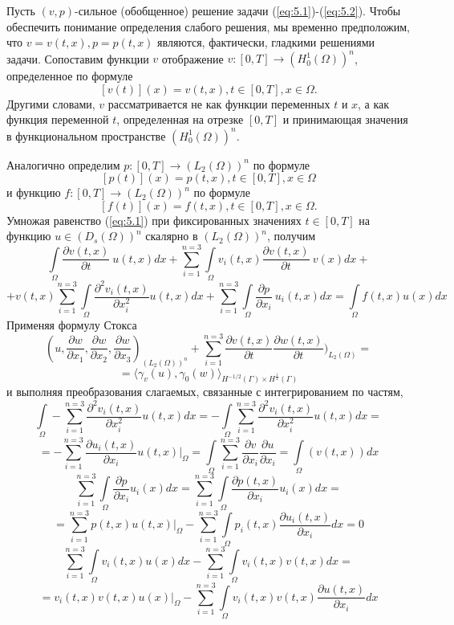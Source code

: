 Пусть $(v,p)$-сильное (обобщенное) решение задачи (\ref{eq:5.1})-(\ref{eq:5.2}).
Чтобы обеспечить понимание определения слабого решения, мы временно предположим, что $v=v(t,x), p=p(t,x)$ являются, фактически, гладкими решениями задачи.
Сопоставим функции $v$ отображение $v:[0,T]\rightarrow (H^{1}_0(\Omega))^n$, определенное по формуле $$[v(t)](x)=v(t,x), t\in[0,T], x\in\Omega.$$
Другими словами, $v$ рассматривается не как функции переменных $t$ и $x$, а как функция переменной $t$, определенная на отрезке
$[0,T]$ и принимающая значения в функциональном пространстве $(H^{1}_0(\Omega))^n$.

Аналогично определим $p:[0,T]\rightarrow (L_2(\Omega))^n$ по формуле $$[p(t)](x)=p(t,x), t\in[0,T],
x\in\Omega$$ и функцию $f:[0,T]\rightarrow (L_2(\Omega))^n$ по формуле $$[f(t)](x)=f(t,x), t\in[0,T], x\in\Omega.$$
Умножая равенство (\ref{eq:5.1}) при фиксированных значениях $t\in [0,T]$ на функцию $u\in (D_s(\Omega))^n$ скалярно в $(L_2(\Omega))^n$, получим
$$\int\limits_\Omega \frac{\partial v(t,x)}{\partial t}\ u(t,x)dx+\sum_{i=1}^{n=3}\int\limits_\Omega v_i(t,x)\frac{\partial v(t,x)}{\partial t}\ v(x)dx+$$
$$+v(t,x)\sum_{i=1}^{n=3}\int\limits_\Omega\frac{\partial^2 v_i(t,x)}{\partial x^{2}_i} u(t,x)dx+\sum_{i=1}^{n=3}\int\limits_\Omega \frac{\partial p}{\partial x_i}\ u_i(t,x)dx=\int\limits_\Omega f(t,x)u(x)dx$$
Применяя формулу Стокса
$$(u,\frac{\partial w}{\partial x_1},\frac{\partial w}{\partial x_2},\frac{\partial w}{\partial x_3})_{(L_2(\Omega))^n}+\sum_{i=1}^{n=3}\frac{\partial v(t,x)}{\partial t}\frac{\partial w(t,x)}{\partial t})_{L_2(\Omega)}=$$
$$= \langle \gamma_v(u),\gamma_0(w) \rangle_{H^{-1/2}(\Gamma)\times H^\frac{1}{2}(\Gamma)}$$
и выполняя преобразования слагаемых, связанные с интегрированием по частям,
$$\int\limits_\Omega -\sum_{i=1}^{n=3}\frac{\partial^2 v_i(t,x)}{\partial x^{2}_i}u(t,x)dx=-\int\limits_\Omega \sum_{i=1}^{n=3}\frac{\partial^2 v_i(t,x)}{\partial x^{2}_i}u(t,x)dx=$$
$$=-\sum_{i=1}^{n=3}\frac{\partial u_i(t,x)}{\partial x_i}u(t,x)|_{\Omega}=\int\limits_\Omega\sum_{i=1}^{n=3}\frac{\partial v}{\partial x_i}\frac{\partial u}{\partial x_i}=\int\limits_\Omega(v(t,x))dx$$
$$\sum_{i=1}^{n=3}\int\limits_\Omega \frac{\partial p}{\partial x_i}u_i(x)dx=\sum_{i=1}^{n=3}\int\limits_\Omega \frac{\partial p(t,x)}{\partial x_i}u_i(x)dx=$$
$$=\sum_{i=1}^{n=3}p(t,x)u(t,x)|_{\Omega}-\sum_{i=1}^{n=3}\int\limits_\Omega p_i(t,x)\frac{\partial u_i(t,x)}{\partial x_i}dx=0$$
$$\sum_{i=1}^{n=3}\int\limits_\Omega v_i(t,x)u(x)dx-\sum_{i=1}^{n=3}\int\limits_\Omega v_i(t,x)v(t,x)dx=$$
$$=v_i(t,x)v(t,x)u(x)|_{\Omega}-\sum_{i=1}^{n=3}\int\limits_\Omega v_i(t,x)v(t,x)\frac{\partial u(t,x)}{\partial x_i}dx$$

